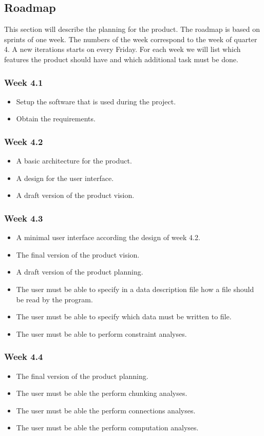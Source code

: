 \subsection{Roadmap}
This section will describe the planning for the product. The roadmap is based on sprints of one week. The numbers of the week correspond to the week of quarter 4. A new iterations starts on every Friday. For each week we will list which features the product should have and which additional task must be done.
\subsubsection{Week 4.1}
\begin{itemize}
	\item Setup the software that is used during the project.
	\item Obtain the requirements.
\end{itemize}

\subsubsection{Week 4.2}
\begin{itemize}
\item A basic architecture for the product.
\item A design for the user interface.
\item A draft version of the product vision.
\end{itemize}
\subsubsection{Week 4.3}
\begin{itemize}
	\item A minimal user interface according the design of week 4.2.
	\item The final version of the product vision.
	\item A draft version of the product planning.
	\item The user must be able to specify in a data description file how a file should be read by the program.
	\item The user must be able to specify which data must be written to file.
	\item The user must be able to perform constraint analyses.
\end{itemize}
\subsubsection{Week 4.4}
\begin{itemize}
	\item The final version of the product planning.
	\item The user must be able the perform chunking analyses.
	\item The user must be able the perform connections analyses.
	\item The user must be able the perform computation analyses.
\end{itemize}
